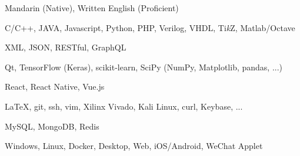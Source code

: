 
\begin{cvtbl}
        {Mandarin (Native), Written English (Proficient)}%

        {C/C++, JAVA, Javascript, Python, PHP, Verilog, VHDL, Ti\textit{k}Z, Matlab/Octave}

        {XML, JSON, RESTful, GraphQL}

        {Qt, TensorFlow (Keras), scikit-learn, SciPy (NumPy, Matplotlib, pandas, ...)}

        {React, React Native, Vue.js}

        {\LaTeX, git, ssh, vim, Xilinx Vivado, Kali Linux, curl, Keybase, ...}

        {MySQL, MongoDB, Redis}

        {Windows, Linux, Docker, Desktop, Web, iOS/Android, WeChat Applet}
\end{cvtbl}

\endinput